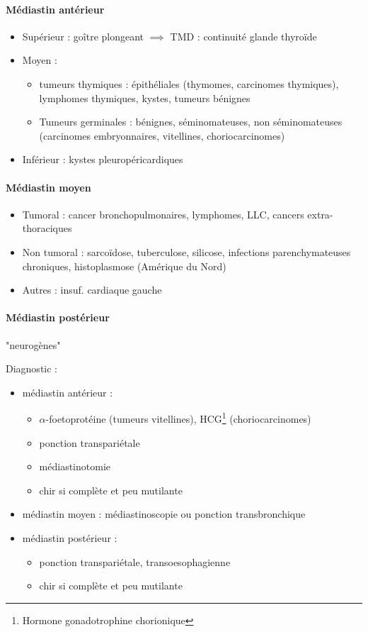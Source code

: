 \paragraph{Médiastin antérieur}
\begin{itemize}
\item Supérieur : goître plongeant $\implies$ TMD : continuité glande thyroïde
\item Moyen : 
  \begin{itemize}
  \item tumeurs thymiques : épithéliales (thymomes, carcinomes thymiques),
    lymphomes thymiques, kystes, tumeurs bénignes
  \item Tumeurs germinales : bénignes, séminomateuses, non séminomateuses
    (carcinomes embryonnaires, vitellines, choriocarcinomes)
  \end{itemize}
\item Inférieur : kystes pleuropéricardiques
\end{itemize}

\paragraph{Médiastin moyen}
\begin{itemize}
\item Tumoral : cancer bronchopulmonaires, lymphomes, LLC, cancers
  extra-thoraciques
\item Non tumoral : sarcoïdose, tuberculose, silicose, infections
  parenchymateuses chroniques, histoplasmose (Amérique du Nord)
\item Autres : insuf. cardiaque gauche
\end{itemize}

\paragraph{Médiastin postérieur} "neurogènes"

Diagnostic :
\begin{itemize}
\item médiastin antérieur : 
  \begin{itemize}
  \item $\alpha$-foetoprotéine (tumeurs vitellines), HCG\footnote{Hormone gonadotrophine chorionique} (choriocarcinomes)
  \item ponction transpariétale
  \item médiastinotomie
  \item chir si complète et peu mutilante
  \end{itemize}
\item médiastin moyen : médiastinoscopie ou ponction transbronchique
\item médiastin postérieur : 
  \begin{itemize}
  \item ponction transpariétale, transoesophagienne
  \item chir si complète et peu mutilante
  \end{itemize}
\end{itemize}

